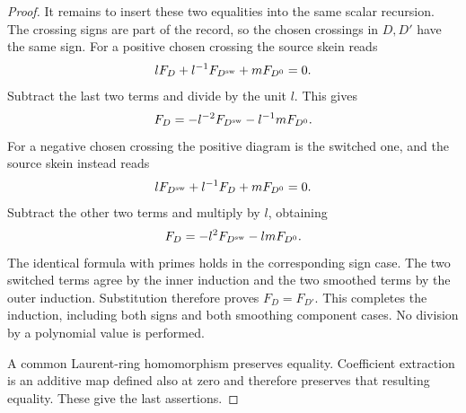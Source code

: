 \begin{proof}
It remains to insert these two equalities into the same scalar recursion.
The crossing signs are part of the record, so the chosen crossings in
$D,D'$ have the same sign. For a positive chosen crossing the source
skein reads
\begin{equation}\label{rp:positive-skein}
 lF_D+l^{-1}F_{D^{\rm sw}}+mF_{D^0}=0.
\end{equation}
Subtract the last two terms and divide by the unit $l$. This gives
\begin{equation}\label{rp:positive-recursion}
 F_D=-l^{-2}F_{D^{\rm sw}}-l^{-1}mF_{D^0}.
\end{equation}
For a negative chosen crossing the positive diagram is the switched one,
and the source skein instead reads
\begin{equation}\label{rp:negative-skein}
 lF_{D^{\rm sw}}+l^{-1}F_D+mF_{D^0}=0.
\end{equation}
Subtract the other two terms and multiply by $l$, obtaining
\begin{equation}\label{rp:negative-recursion}
 F_D=-l^2F_{D^{\rm sw}}-lmF_{D^0}.
\end{equation}
The identical formula with primes holds in the corresponding sign case.
The two switched terms agree by the inner induction and the two smoothed
terms by the outer induction. Substitution therefore proves $F_D=F_{D'}$.
This completes the induction, including both signs and both smoothing
component cases. No division by a polynomial value is performed.

A common Laurent-ring homomorphism preserves equality. Coefficient
extraction is an additive map defined also at zero and therefore preserves
that resulting equality. These give the last assertions.
\end{proof}

